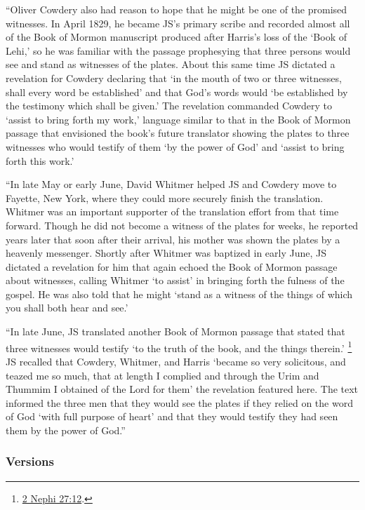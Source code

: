 			``Oliver Cowdery also had reason to hope that he might be one of the promised witnesses. In April 1829, he became JS's primary scribe and recorded almost all of the Book of Mormon manuscript produced after Harris's loss of the `Book of Lehi,' so he was familiar with the passage prophesying that three persons would see and stand as witnesses of the plates. About this same time JS dictated a revelation for Cowdery declaring that `in the mouth of two or three witnesses, shall every word be established' and that God's words would `be established by the testimony which shall be given.' The revelation commanded Cowdery to `assist to bring forth my work,' language similar to that in the Book of Mormon passage that envisioned the book's future translator showing the plates to three witnesses who would testify of them `by the power of God' and `assist to bring forth this work.'
			
			``In late May or early June, David Whitmer helped JS and Cowdery move to Fayette, New York, where they could more securely finish the translation. Whitmer was an important supporter of the translation effort from that time forward. Though he did not become a witness of the plates for weeks, he reported years later that soon after their arrival, his mother was shown the plates by a heavenly messenger. Shortly after Whitmer was baptized in early June, JS dictated a revelation for him that again echoed the Book of Mormon passage about witnesses, calling Whitmer `to assist' in bringing forth the fulness of the gospel. He was also told that he might `stand as a witness of the things of which you shall both hear and see.'
			
			``In late June, JS translated another Book of Mormon passage that stated that three witnesses would testify `to the truth of the book, and the things therein.'%
				\footnote{%
					\hyperref[2NEPHI-27-12]{2 Nephi 27:12}.
					}
			JS recalled that Cowdery, Whitmer, and Harris `became so very solicitous, and teazed me so much, that at length I complied and through the Urim and Thummim I obtained of the Lord for them' the revelation featured here. The text informed the three men that they would see the plates if they relied on the word of God `with full purpose of heart' and that they would testify they had seen them by the power of God.''			
			
	\subsubsection{Versions}
		\label{DC17-V}
	
